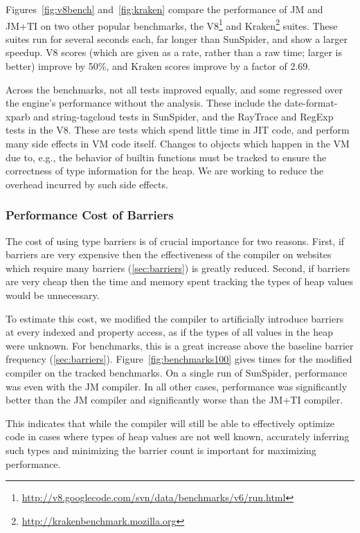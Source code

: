 Figures~\ref{fig:v8bench} and~\ref{fig:kraken} compare the performance of JM and JM+TI
on two other popular benchmarks, the V8\footnote{\url{http://v8.googlecode.com/svn/data/benchmarks/v6/run.html}}
and Kraken\footnote{\url{http://krakenbenchmark.mozilla.org}} suites.
These suites run for several seconds each, far longer than SunSpider,
and show a larger speedup.
V8 scores (which are given as a rate, rather than a raw time; larger is better) improve by 50\%,
and Kraken scores improve by a factor of 2.69.

Across the benchmarks, not all tests improved equally, and some regressed over
the engine's performance without the analysis.
These include the date-format-xparb and string-tagcloud tests in SunSpider,
and the RayTrace and RegExp tests in the V8.
These are tests which spend little time in JIT code, and perform many side
effects in VM code itself.
Changes to objects which happen in the VM due to, e.g., the behavior of
builtin functions must be tracked to ensure the correctness of type
information for the heap.
We are working to reduce the overhead incurred by such side effects.

\subsubsection{Performance Cost of Barriers}

The cost of using type barriers is of crucial importance for two reasons.
First, if barriers are very expensive then the effectiveness of the compiler
on websites which require many barriers (\Section\ref{sec:barriers})
is greatly reduced.
Second, if barriers are very cheap then the time and memory spent
tracking the types of heap values would be unnecessary.

To estimate this cost, we modified the compiler to artificially introduce
barriers at every indexed and property access, as if the types of all values
in the heap were unknown.
For benchmarks, this is a great increase above the baseline barrier
frequency (\Section\ref{sec:barriers}).
Figure~\ref{fig:benchmarks100} gives times for the modified compiler on the
tracked benchmarks.
On a single run of SunSpider, performance was even with the JM
compiler.
In all other cases, performance was significantly better than the JM
compiler and significantly worse than the JM+TI compiler.

This indicates that while the compiler will still be able to effectively
optimize code in cases where types of heap values are not well known,
accurately inferring such types and minimizing the barrier count is important
for maximizing performance.

